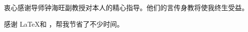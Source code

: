 \begin{acknowledgement}
  衷心感谢导师钟海旺副教授对本人的精心指导。他们的言传身教将使我终生受益。

  感谢 \LaTeX 和 \thuthesis\cite{thuthesis}，帮我节省了不少时间。
\end{acknowledgement}
